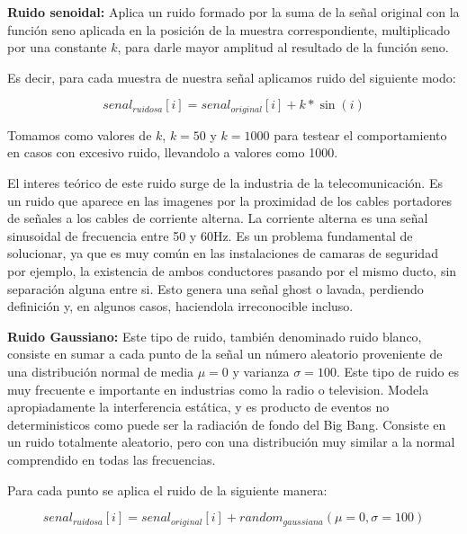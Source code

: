 \begin{itemize}
	\begin{item} {\bf Ruido senoidal:} Aplica un ruido formado por la suma de la se\~nal
original con la funci\'on seno aplicada en la posici\'on de la muestra
correspondiente, multiplicado por una constante $k$, para darle mayor amplitud al resultado de
la funci\'on seno.

	Es decir, para cada muestra de nuestra se\~nal aplicamos ruido del siguiente
modo:

$$senal_{ruidosa}[i] = senal_{original}[i] + k * \sin(i)$$

  
Tomamos como valores de $k$, $k=50$ y $k=1000$ para testear el comportamiento en casos con excesivo ruido, llevandolo a valores
como 1000.

El interes te\'orico de este ruido surge de la industria de la telecomunicaci\'on. Es un ruido que aparece en las imagenes por 
la proximidad de los cables portadores de se\~nales a los cables de corriente alterna. La corriente alterna
es una se\~nal sinusoidal de frecuencia entre  50 y 60Hz. Es un problema fundamental de solucionar, ya que es muy com\'un en
las instalaciones de camaras de seguridad por ejemplo, la existencia de ambos conductores pasando por el mismo ducto, sin separaci\'on
alguna entre si. Esto genera una se\~nal ghost o lavada, perdiendo definici\'on y, en algunos casos, haciendola irreconocible incluso.
	\end{item}

	\begin{item}
		{\bf Ruido Gaussiano:} Este tipo de ruido, tambi\'en denominado ruido
blanco, consiste en sumar a cada punto de la se\~nal un n\'umero aleatorio
proveniente de una distribuci\'on normal de media $\mu = 0$ y varianza $\sigma=100$. 
Este tipo de ruido es muy frecuente e importante en industrias como la radio o television.
Modela apropiadamente la interferencia est\'atica, y es producto de eventos no deterministicos como 
puede ser la radiaci\'on de fondo del Big Bang. Consiste en un ruido totalmente aleatorio, pero con 
una distribuci\'on muy similar a la normal comprendido en todas las frecuencias.

 	Para cada punto se aplica el ruido de la siguiente manera:

    $$senal_{ruidosa}[i] = senal_{original}[i] + random_{gaussiana}(\mu=0, \sigma=100)$$


	\end{item}
\end{itemize}

